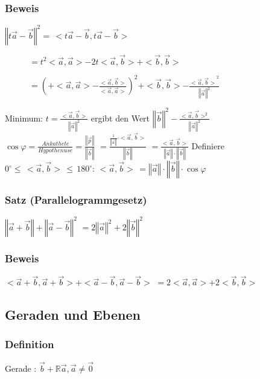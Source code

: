 \subsubsection{Beweis}
$\left\Vert t\vec{a} - \vec{b}\right\Vert^{2} = \, <t\vec{a} - \vec{b}, t\vec{a} - \vec{b}>$
\begin{description}
 \item [\tab] $ = t^{2}<\vec{a}, \vec{a}> - 2t<\vec{a}, \vec{b}> + <\vec{b}, \vec{b}>$
 \item [\tab] $ = \left(+ <\vec{a},\vec{a}> - \frac{<\vec{a}, \vec{b}>}{<\vec{a}, \vec{a}>}\right)^{2}
 + <\vec{b}, \vec{b}> - \frac{<{\vec{a}, \vec{b}>}^2}{\left\Vert\vec{a}\right\Vert^{2}}$
\end{description}
Minimum: $ t = \frac{<\vec{a}, \vec{b}>}{\left\Vert\vec{a}\right\Vert^2}$
ergibt den Wert $\left\Vert\vec{b}\right\Vert^2 - \frac{<\vec{a}, \vec{b}>^2}{\left\Vert\vec{a}\right\Vert^2}$\\
$\cos\varphi = \frac{Ankathete}{Hypothenuse} = \frac{\left\Vert\vec{p}\right\Vert}{\left\Vert\vec{b}\right\Vert}$
$= \frac{\frac{1}{\left\Vert\vec{a}\right\Vert}\cdot<\vec{a}, \vec{b}>}{\left\Vert\vec{b}\right\Vert}$
$= \frac{<\vec{a}, \vec{b}>}{\left\Vert\vec{a}\right\Vert\cdot\left\Vert\vec{b}\right\Vert}$
Definiere $0^{\circ}\leq\, <\vec{a}, \vec{b}>\, \leq\,  180^{\circ} :\, <\vec{a}, \vec{b}>\, = \left\Vert\vec{a}\right\Vert\cdot\left\Vert\vec{b}\right\Vert\cdot\cos\varphi$
%
%
%
\subsubsection{Satz (Parallelogrammgesetz)}
%
%
$\left\Vert\vec{a} + \vec{b}\right\Vert + \left\Vert\vec{a} - \vec{b}\right\Vert^{2}$
$= 2\left\Vert\vec{a}\right\Vert^2 + 2\left\Vert\vec{b}\right\Vert^2$
%
%
%
\subsubsection{Beweis}
$<\vec{a} + \vec{b}, \vec{a} + \vec{b}> + <\vec{a} -\vec{b}, \vec{a} - \vec{b}>$
$= 2<\vec{a}, \vec{a}> + 2<\vec{b}, \vec{b}>$
%
%
%
\subsection{Geraden und Ebenen}
\subsubsection{Definition}
Gerade : $\vec{b} + \mathbb{R}\vec{a}, \vec{a}\neq\vec{0}$
%
%
%
%
%
%
